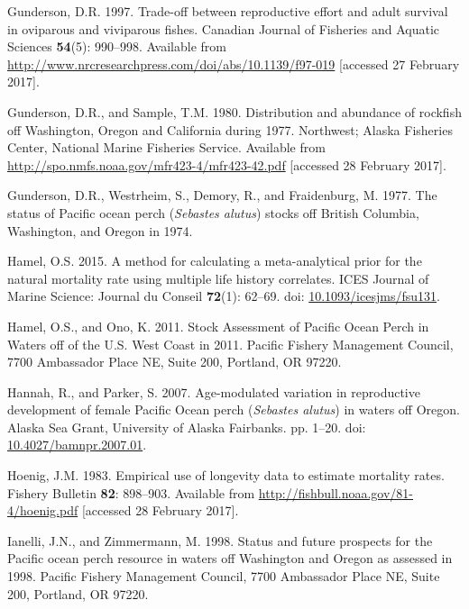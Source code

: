 \documentclass[12pt,]{article}
\begin{document}
\hypertarget{ref-gunderson_trade-off_1997}{}
Gunderson, D.R. 1997. Trade-off between reproductive effort and adult
survival in oviparous and viviparous fishes. Canadian Journal of
Fisheries and Aquatic Sciences \textbf{54}(5): 990--998. Available from
\url{http://www.nrcresearchpress.com/doi/abs/10.1139/f97-019}
{[}accessed 27 February 2017{]}.

\hypertarget{ref-gunderson_distribution_1980}{}
Gunderson, D.R., and Sample, T.M. 1980. Distribution and abundance of
rockfish off Washington, Oregon and California during 1977. Northwest;
Alaska Fisheries Center, National Marine Fisheries Service. Available
from \url{http://spo.nmfs.noaa.gov/mfr423-4/mfr423-42.pdf} {[}accessed
28 February 2017{]}.

\hypertarget{ref-gunderson_status_1977}{}
Gunderson, D.R., Westrheim, S., Demory, R., and Fraidenburg, M. 1977.
The status of Pacific ocean perch (\emph{Sebastes alutus}) stocks off
British Columbia, Washington, and Oregon in 1974.

\hypertarget{ref-hamel_method_2015}{}
Hamel, O.S. 2015. A method for calculating a meta-analytical prior for
the natural mortality rate using multiple life history correlates. ICES
Journal of Marine Science: Journal du Conseil \textbf{72}(1): 62--69.
doi:
\href{https://doi.org/10.1093/icesjms/fsu131}{10.1093/icesjms/fsu131}.

\hypertarget{ref-hamel_stock_2011}{}
Hamel, O.S., and Ono, K. 2011. Stock Assessment of Pacific Ocean Perch
in Waters off of the U.S. West Coast in 2011. Pacific Fishery Management
Council, 7700 Ambassador Place NE, Suite 200, Portland, OR 97220.

\hypertarget{ref-hannah_age-modulated_2007}{}
Hannah, R., and Parker, S. 2007. Age-modulated variation in reproductive
development of female Pacific Ocean perch (\emph{Sebastes alutus}) in
waters off Oregon. Alaska Sea Grant, University of Alaska Fairbanks. pp.
1--20. doi:
\href{https://doi.org/10.4027/bamnpr.2007.01}{10.4027/bamnpr.2007.01}.

\hypertarget{ref-hoenig_empirical_1983}{}
Hoenig, J.M. 1983. Empirical use of longevity data to estimate mortality
rates. Fishery Bulletin \textbf{82}: 898--903. Available from
\url{http://fishbull.noaa.gov/81-4/hoenig.pdf} {[}accessed 28 February
2017{]}.

\hypertarget{ref-ianelli_status_1998}{}
Ianelli, J.N., and Zimmermann, M. 1998. Status and future prospects for
the Pacific ocean perch resource in waters off Washington and Oregon as
assessed in 1998. Pacific Fishery Management Council, 7700 Ambassador
Place NE, Suite 200, Portland, OR 97220.
\end{document}
